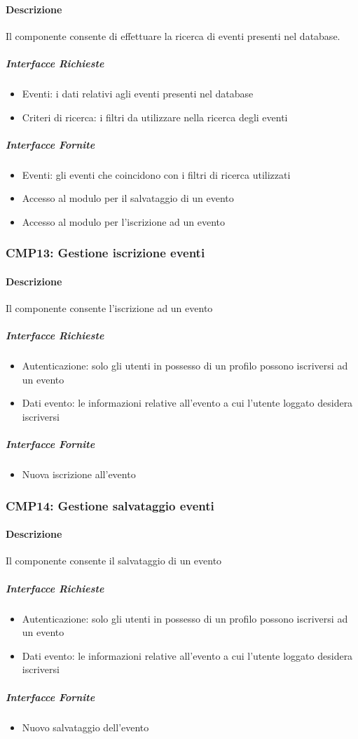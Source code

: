 \documentclass[9pt]{extarticle}
\begin{document}
\paragraph{Descrizione}
Il componente consente di effettuare la ricerca di eventi presenti nel database.
\subparagraph{Interfacce Richieste}
\begin{itemize}
	\item Eventi: i dati relativi agli eventi presenti nel database
	\item Criteri di ricerca: i filtri da utilizzare nella ricerca degli eventi
\end{itemize}
\subparagraph{Interfacce Fornite}
\begin{itemize}
	\item Eventi: gli eventi che coincidono con i filtri di ricerca utilizzati
	\item Accesso al modulo per il salvataggio di un evento
	\item Accesso al modulo per l'iscrizione ad un evento
\end{itemize}

\subsubsection*{CMP13: Gestione iscrizione eventi}
\paragraph{Descrizione}
Il componente consente l'iscrizione ad un evento
\subparagraph{Interfacce Richieste}
\begin{itemize}
	\item Autenticazione: solo gli utenti in possesso di un profilo possono iscriversi ad un evento
	\item Dati evento: le informazioni relative all'evento a cui l'utente loggato desidera iscriversi
\end{itemize}
\subparagraph{Interfacce Fornite}
\begin{itemize}
	\item Nuova iscrizione all'evento
\end{itemize}

\subsubsection*{CMP14: Gestione salvataggio eventi}
\paragraph{Descrizione}
Il componente consente il salvataggio di un evento
\subparagraph{Interfacce Richieste}
\begin{itemize}
	\item Autenticazione: solo gli utenti in possesso di un profilo possono iscriversi ad un evento
	\item Dati evento: le informazioni relative all'evento a cui l'utente loggato desidera iscriversi
\end{itemize}
\subparagraph{Interfacce Fornite}
\begin{itemize}
	\item Nuovo salvataggio dell'evento
\end{itemize}
\end{document}
